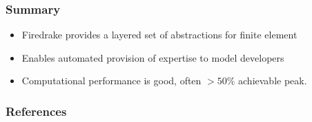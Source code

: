 \documentclass[presentation]{beamer}
\begin{document}
\begin{frame}
  \frametitle{Summary}
  \begin{itemize}
  \item Firedrake provides a layered set of abstractions for finite
    element
  \item Enables automated provision of expertise to model developers
  \item Computational performance is good, often $>50\%$ achievable
    peak.
  \end{itemize}
\end{frame}

\appendix
\begin{frame}[t]
  \frametitle{References}
  \printbibliography[heading=none]
\end{frame}
\end{document}
